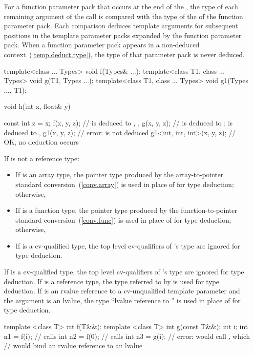 \exitexample
For a function parameter pack that occurs at the end of the ,
the type  of each
remaining argument of the call is compared with the type 
of the  of the function parameter pack.
Each comparison deduces template arguments for subsequent positions in
the template parameter packs expanded by the function parameter pack.
When a function parameter pack appears in a non-deduced
context~(\ref{temp.deduct.type}), the type of that parameter pack is
never deduced.
\enterexample

\begin{codeblock}
template<class ... Types> void f(Types& ...);
template<class T1, class ... Types> void g(T1, Types ...);
template<class T1, class ... Types> void g1(Types ..., T1);

void h(int x, float& y) {
  const int z = x;
  f(x, y, z);                  //  is deduced to , , 
  g(x, y, z);                  //  is deduced to ;  is deduced to , 
  g1(x, y, z);                 // error:  is not deduced
  g1<int, int, int>(x, y, z);  // OK, no deduction occurs

}
\end{codeblock}

\exitexample

\pnum
If
is not a reference type:

\begin{itemize}
\item
If
is an array type, the pointer type produced by the array-to-pointer
standard conversion~(\ref{conv.array}) is used in place of
for type deduction;
otherwise,
\item
If
is a function type, the pointer type produced by the
function-to-pointer standard conversion~(\ref{conv.func}) is used in place
of
for type
deduction; otherwise,
\item
If
is a cv-qualified type, the top level cv-qualifiers of
's
type are ignored for type deduction.
\end{itemize}

\pnum
If
is a cv-qualified type, the top level cv-qualifiers of
's
type are ignored for type deduction.
If
is a reference type, the type
referred to by
is used for type deduction.
If  is an rvalue reference to a cv-unqualified template parameter and the argument is an
lvalue, the type ``lvalue reference to '' is used in place of  for type
deduction. \enterexample
\begin{codeblock}
template <class T> int f(T&&);
template <class T> int g(const T&&);
int i;
int n1 = f(i);                  // calls 
int n2 = f(0);                  // calls 
int n3 = g(i);                  // error: would call , which
                                // would bind an rvalue reference to an lvalue
\end{codeblock}
\exitexample

